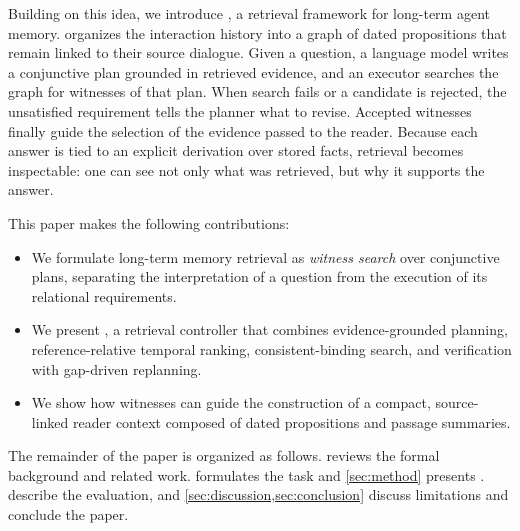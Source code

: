 Building on this idea, we introduce \sys, a retrieval framework for
long-term agent memory. \sys organizes the interaction history into a
graph of dated propositions that remain linked to their source dialogue.
Given a question, a language model writes a conjunctive plan grounded in
retrieved evidence, and an executor searches the graph for witnesses of
that plan. When search fails or a candidate is rejected, the unsatisfied
requirement tells the planner what to revise. Accepted witnesses finally
guide the selection of the evidence passed to the reader. Because each
answer is tied to an explicit derivation over stored facts, retrieval
becomes inspectable: one can see not only what was retrieved, but why it
supports the answer.

This paper makes the following contributions:
\begin{itemize}
  \item We formulate long-term memory retrieval as \emph{witness search}
    over conjunctive plans, separating the interpretation of a question
    from the execution of its relational requirements.
  \item We present \sys, a retrieval controller that combines
    evidence-grounded planning, reference-relative temporal ranking,
    consistent-binding search, and verification with gap-driven
    replanning.
  \item We show how witnesses can guide the construction of a compact,
    source-linked reader context composed of dated propositions and
    passage summaries.
\end{itemize}

The remainder of the paper is organized as follows.
 reviews the formal background and related work.
 formulates the task and \cref{sec:method} presents
\sys.  describe the evaluation, and
\cref{sec:discussion,sec:conclusion} discuss limitations and conclude
the paper.
